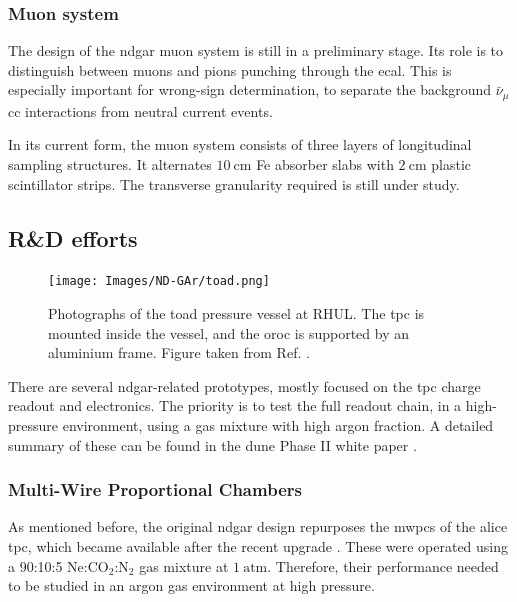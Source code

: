 \subsubsection{Muon system}

The design of the \gls{ndgar} muon system is still in a preliminary stage. Its role is to distinguish between muons and pions punching through the \gls{ecal}. This is especially important for wrong-sign determination, to separate the background $\bar{\nu}_{\mu}$ \gls{cc} interactions from neutral current events.

In its current form, the muon system consists of three layers of longitudinal sampling structures. It alternates $10~\mathrm{cm}$ Fe absorber slabs with $2~\mathrm{cm}$ plastic scintillator strips. The transverse granularity required is still under study.

\subsection{R\&D efforts}

\begin{figure}[t]
	\centering
	\texttt{[image: Images/ND-GAr/toad.png]}
	\caption[Photographs of the \gls{toad} pressure vessel at RHUL.]{Photographs of the \gls{toad} pressure vessel at RHUL. The \gls{tpc} is mounted inside the vessel, and the \gls{oroc} is supported by an aluminium frame. Figure taken from Ref. \cite{Ritchie-Yates2023}.}
	\label{fig:toad}
\end{figure}

There are several \gls{ndgar}-related prototypes, mostly focused on the \gls{tpc} charge readout and electronics. The priority is to test the full readout chain, in a high-pressure environment, using a gas mixture with high argon fraction. A detailed summary of these can be found in the \gls{dune} Phase II white paper \cite{DUNE2024Phase2}.

\subsubsection{Multi-Wire Proportional Chambers}

As mentioned before, the original \gls{ndgar} design repurposes the \gls{mwpc}s of the \gls{alice} \gls{tpc}, which became available after the recent upgrade \cite{ALICETPC2020}. These were operated using a 90:10:5 $\mathrm{Ne}$:$\mathrm{CO}_{2}$:$\mathrm{N}_{2}$ gas mixture at $1~\mathrm{atm}$. Therefore, their performance needed to be studied in an argon gas environment at high pressure.


